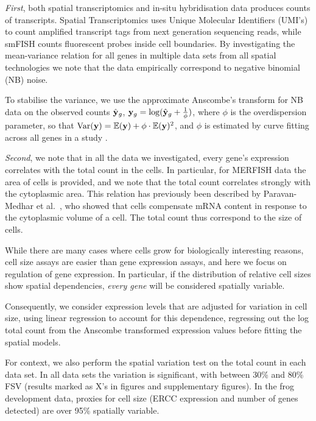 \textit{First}, both spatial transcriptomics and in-situ hybridisation data produces counts of transcripts. Spatial Transcriptomics uses Unique Molecular Identifiers (UMI's) to count amplified transcript tags from next generation sequencing reads, while smFISH counts fluorescent probes inside cell boundaries. By investigating the mean-variance relation for all genes in multiple data sets from all spatial technologies we note that the data empirically correspond to negative binomial (NB) noise.

To stabilise the variance, we use the approximate Anscombe's transform for NB data on the observed counts \( \hat{{\bf y}}_g \), \( {\bf y}_g = \log(\hat{{\bf y}}_g + \frac{1}{\phi}) \), where \( \phi \) is the overdispersion parameter, so that \( \text{Var}({\bf y}) = \mathbb{E}({\bf y}) + \phi \cdot \mathbb{E}({\bf y})^2 \), and \( \phi \) is estimated by curve fitting across all genes in a study \cite{Anscombe1948-uw}.

\textit{Second}, we note that in all the data we investigated, every gene's expression correlates with the total count in the cells. In particular, for MERFISH data the area of cells is provided, and we note that the total count correlates strongly with the cytoplasmic area.  This relation has previously been described by Paravan-Medhar et al.~\cite{Padovan-Merhar2015-ne}, who showed that cells compensate mRNA content in response to the cytoplasmic volume of a cell. The total count thus correspond to the size of cells.

While there are many cases where cells grow for biologically interesting reasons, cell size assays are easier than gene expression assays, and here we focus on regulation of gene expression.  In particular, if the distribution of relative cell sizes show spatial dependencies, \emph{every gene} will be considered spatially variable.

Consequently, we consider expression levels that are adjusted for variation in cell size, using linear regression to account for this dependence, regressing out the log total count from the Anscombe transformed expression values before fitting the spatial models.

For context, we also perform the spatial variation test on the total count in each data set. In all data sets the variation is significant, with between 30\% and 80\% FSV (results marked as X's in figures and supplementary figures). In the frog development data, proxies for cell size (ERCC expression and number of genes detected) are over 95\% spatially variable.

